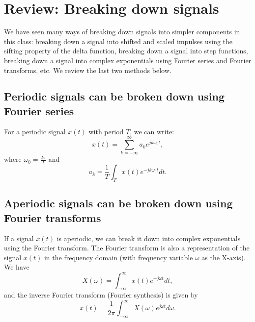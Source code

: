 \section{Review: Breaking down signals}
We have seen many ways of breaking down signals into simpler components in this class: breaking down a signal into shifted and scaled impulses using the sifting property of the delta function, breaking down a signal into step functions, breaking down a signal into complex exponentials using Fourier series and Fourier transforms, etc. We review the last two methods below.
\subsection{Periodic signals can be broken down using Fourier series}
For a periodic signal $x(t)$ with period $T$, we can write:
\begin{equation}
    \label{eq:w10l1-fs-synthesis}
x(t) = \sum_{k=-\infty}^{\infty} a_k e^{j k \omega_0 t}, \end{equation}
where $\omega_0 = \frac{2\pi}{T}$ and 
\begin{equation}
    \label{eq:w10l1-fs-analysis}
    a_k = \frac{1}{T} \int_{T} x(t) e^{-j k \omega_0 t} dt.
\end{equation}

\subsection{Aperiodic signals can be broken down using Fourier transforms}
If a signal $x(t)$ is aperiodic, we can break it down into complex exponentials using the Fourier transform. The Fourier transform is also a representation of the signal $x(t)$ in the frequency domain (with frequency variable $\omega$ as the X-axis). We have
\begin{equation}
    \label{eq:w10l1-ft-analysis}
X(\omega) = \int_{-\infty}^{\infty} x(t) e^{-j \omega t} dt,
\end{equation}
and the inverse Fourier transform (Fourier synthesis) is given by
\begin{equation}
    \label{eq:w10l1-ft-synthesis}
x(t) = \frac{1}{2\pi} \int_{-\infty}^{\infty} X(\omega) e^{j \omega t} d\omega.
\end{equation}

